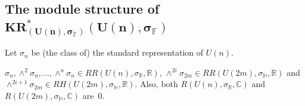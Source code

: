 \subsection[The module structure of $KR^*_{(U(n), \sigma_\mathbb{F})}(U(n),\sigma_\mathbb{F})$]{The
module structure of $\boldsymbol{KR^*_{(U(n), \sigma_\mathbb{F})}(U(n),\sigma_\mathbb{F})}$}

\begin{Definition}
Let $\sigma_n$ be (the class of) the standard representation of $U(n)$.
\end{Definition}

\begin{Proposition}
\label{realrepunitary}
$\sigma_n,\wedge^2\sigma_n, \dots, \wedge^n\sigma_n\in RR(U(n), \sigma_\mathbb{R}, \mathbb{R})$, $\wedge^{2i}
\sigma_{2m}
\in RR(U(2m),
\sigma_\mathbb{H}, \mathbb{R})$ and $\wedge^{2i+1}
\sigma_{2m}
\in RH(U(2m),
\sigma_\mathbb{H}, \mathbb{R})$.
Also, both $R(U(n),
\sigma_\mathbb{R}, \mathbb{C})$ and $R(U(2m),
\sigma_\mathbb{H}, \mathbb{C})$ are~$0$.
\end{Proposition}
